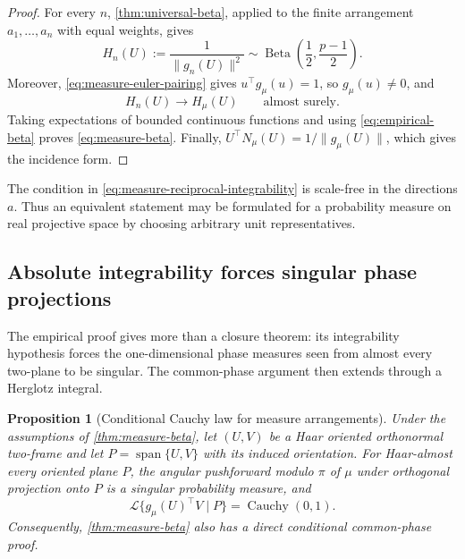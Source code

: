 \documentclass[11pt]{article}
\numberwithin{equation}{section}
\theoremstyle{thmstyleone}%
\newtheorem{proposition}[proposition]{Proposition}
\theoremstyle{thmstyletwo}%
\let\cref\autoref
\newcommand{\Beta}{\operatorname{Beta}}
\newcommand{\Cauchy}{\operatorname{Cauchy}}
\newcommand{\Law}{\mathcal L}
\begin{document}
\begin{proof}
For every \(n\), \cref{thm:universal-beta}, applied to the finite
arrangement \(a_1,\ldots,a_n\) with equal weights, gives
\begin{equation}
  H_n(U):=\frac{1}{\|g_n(U)\|^2}
  \sim\Beta\!\left(\frac12,\frac{p-1}{2}\right).
  \label{eq:empirical-beta}
\end{equation}
Moreover, \cref{eq:measure-euler-pairing} gives
\(u^\top g_\mu(u)=1\), so \(g_\mu(u)\neq0\), and
\[
  H_n(U)\longrightarrow H_\mu(U)
  \qquad\text{almost surely}.
\]
Taking expectations of bounded continuous functions and using
\cref{eq:empirical-beta} proves \cref{eq:measure-beta}.  Finally,
\(U^\top N_\mu(U)=1/\|g_\mu(U)\|\), which gives the incidence form.
\end{proof}

The condition in \cref{eq:measure-reciprocal-integrability} is scale-free in
the directions \(a\).  Thus an equivalent statement may be formulated for
a probability measure on real projective space by choosing arbitrary unit
representatives.

\subsection{Absolute integrability forces singular phase projections}

The empirical proof gives more than a closure theorem: its integrability
hypothesis forces the one-dimensional phase measures seen from almost every
two-plane to be singular.  The common-phase argument then extends through a
Herglotz integral.

\begin{proposition}[Conditional Cauchy law for measure arrangements]
\label{prop:measure-conditional-cauchy}
Under the assumptions of \cref{thm:measure-beta}, let \((U,V)\) be a Haar
oriented orthonormal two-frame and let \(P=\operatorname{span}\{U,V\}\) with
its induced orientation.  For Haar-almost every oriented plane \(P\), the
angular pushforward modulo \(\pi\) of \(\mu\) under orthogonal projection
onto \(P\) is a singular probability measure, and
\begin{equation}
  \Law\{g_\mu(U)^\top V\mid P\}
  =\Cauchy(0,1).
  \label{eq:measure-conditional-cauchy}
\end{equation}
Consequently, \cref{thm:measure-beta} also has a direct conditional
common-phase proof.
\end{proposition}
\end{document}
